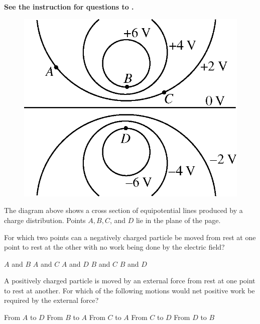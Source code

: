 \textbf{See the instruction for questions  to .}

\begin{figure}[H]
    \center
    \includegraphics[scale=0.25]{images/img-009-018.png}
\end{figure}

The diagram above shows a cross section of equipotential lines produced by a charge distribution. Points $A, B, C$, and $D$ lie in the plane of the page.

\begin{questions}\setcounter{question}{22}\question
For which two points can a negatively charged particle be moved from rest at one point to rest at the other with no work being done by the electric field?

\begin{oneparchoices}
\choice $A$ and $B$
\choice $A$ and $C$
\choice $A$ and $D$
\choice $B$ and $C$
\choice $B$ and $D$
\end{oneparchoices}\end{questions}

\begin{questions}\setcounter{question}{23}\question
A positively charged particle is moved by an external force from rest at one point to rest at another. For which of the following motions would net positive work be required by the external force?

\begin{oneparchoices}
\choice From $A$ to $D$
\choice From $B$ to $A$
\choice From $C$ to $A$
\choice From $C$ to $D$
\choice From $D$ to $B$
\end{oneparchoices}\end{questions}

